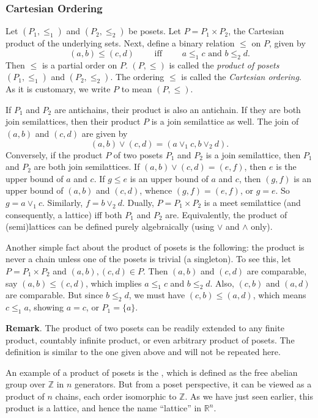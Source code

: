 \documentclass[12pt]{article}
\begin{document}
\subsubsection*{Cartesian Ordering}

Let $(P_1,\le_1)$ and $(P_2,\le_2)$ be posets.  Let $P=P_1\times P_2$, the Cartesian product of the underlying sets.  Next, define a binary relation $\le$ on $P$, given by $$(a,b)\le (c,d)\qquad\mbox{ iff }\qquad a\le_1 c\mbox{ and }b\le_2 d.$$  Then $\le$ is a partial order on $P$.  $(P,\le)$ is called the \emph{product of posets} $(P_1,\le_1)$ and $(P_2,\le_2)$.  The ordering $\le$ is called the \emph{Cartesian ordering}.  As it is customary, we write $P$ to mean $(P,\le)$.

If $P_1$ and $P_2$ are antichains, their product is also an antichain.  If they are both join semilattices, then their product $P$ is a join semilattice as well.  The join of $(a,b)$ and $(c,d)$ are given by $$(a,b)\vee (c,d)=(a\vee_1 c,b\vee_2 d).$$  Conversely, if the product $P$ of two posets $P_1$ and $P_2$ is a join semilattice, then $P_1$ and $P_2$ are both join semilattices.  If $(a,b)\vee (c,d)=(e,f)$, then $e$ is the upper bound of $a$ and $c$.  If $g\le e$ is an upper bound of $a$ and $c$, then $(g,f)$ is an upper bound of $(a,b)$ and $(c,d)$, whence $(g,f)=(e,f)$, or $g=e$.  So $g=a\vee_1 c$.  Similarly, $f=b\vee_2 d$.  Dually, $P=P_1\times P_2$ is a meet semilattice (and consequently, a lattice) iff both $P_1$ and $P_2$ are.  Equivalently, the product of (semi)lattices can be defined purely algebraically (using $\vee$ and $\wedge$ only).

Another simple fact about the product of posets is the following: the product is never a chain unless one of the posets is trivial (a singleton).  To see this, let $P=P_1\times P_2$ and $(a,b),(c,d)\in P$.  Then $(a,b)$ and $(c,d)$ are comparable, say $(a,b)\le (c,d)$, which implies $a\le_1 c$ and $b\le_2 d$.  Also, $(c,b)$ and $(a,d)$ are comparable.  But since $b\le_2 d$, we must have $(c,b)\le (a,d)$, which means $c\le_1 a$, showing $a=c$, or $P_1=\lbrace a\rbrace$.

\textbf{Remark}.  The product of two posets can be readily extended to any finite product, countably infinite product, or even arbitrary product of posets.  The definition is similar to the one given above and will not be repeated here.

An example of a product of posets is the , which is defined as the free abelian group over $\mathbb{Z}$ in $n$ generators.  But from a poset perspective, it can be viewed as a product of $n$ chains, each order isomorphic to $\mathbb{Z}$.  As we have just seen earlier, this product is a lattice, and hence the name ``lattice'' in $\mathbb{R}^n$.
\end{document}
